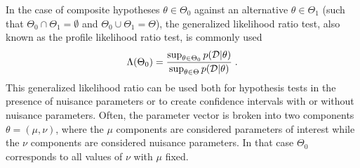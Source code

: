 \documentclass[12pt]{article}
\numberwithin{equation}{section}
\theoremstyle{plain}
\begin{document}

In the case of composite hypotheses $\theta \in \Theta_0$ against an alternative
$\theta \in \Theta_1$ (such that $\Theta_0 \cap \Theta_1 = \emptyset$ and $\Theta_0 \cup \Theta_1 = \Theta$), the
generalized likelihood ratio test, also known as the profile likelihood ratio
test, is commonly used
\begin{equation}\label{eqn:generalized-lr}
\Lambda(\Theta_0) =  \frac{ \sup_{\theta \in \Theta_0} p({\cal D} | \theta)}{ \sup_{\theta \in \Theta} p({\cal D} | \theta)} \; .
\end{equation}
This generalized likelihood ratio can be used both for hypothesis tests in the
presence of nuisance parameters or to create confidence intervals with or
without nuisance parameters.  Often, the parameter vector is broken into two
components $\theta=(\mu,\nu)$, where the $\mu$ components are considered
parameters of interest while the $\nu$ components are considered nuisance
parameters. In that case $\Theta_0$ corresponds to all values of $\nu$ with
$\mu$ fixed.
\end{document}
